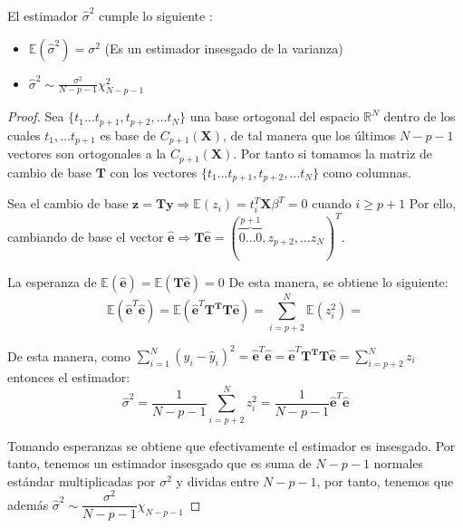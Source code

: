 \begin{propo}
El estimador $\hat{\sigma}^2$ cumple lo siguiente :
\begin{itemize}
\item $\mathbb{E}(\hat{\sigma} ^2)=\sigma^2$ (Es un estimador insesgado de la varianza)
\item  $\hat{\sigma}^2 \sim \frac{\sigma^2}{N-p-1}\chi_{N-p-1}^2 $
\end{itemize}
\begin{proof}
\noindent Sea $\lbrace t_{1}\ldots t_{p+1}, t_{p+2}, \ldots t_{N}\rbrace$ una base ortogonal del espacio $\mathbb{R}^N$ dentro de los cuales $t_{1},\ldots t_{p+1}$ es base de $C_{p+1}(\mathbf{X})$, de tal manera que los últimos $N-p-1$ vectores son ortogonales a la $C_{p+1}(\mathbf{X})$. Por tanto si tomamos la matriz de cambio de base $\mathbf{T}$ con los vectores $\lbrace t_{1}\ldots t_{p+1}, t_{p+2}, \ldots t_{N}\rbrace$ como columnas. 

\noindent Sea el cambio de base $\mathbf{z}=\mathbf{T} \mathbf{y}\Rightarrow \mathbb{E}(z_i)=t_i^T \mathbf{X}\beta^T=0 $ cuando $i\geq p+1$ Por ello, cambiando de base el vector $\hat{\mathbf{e}}\Rightarrow \mathbf{T}\hat{\mathbf{e}}=(\overbrace{0\ldots 0}^{p+1},z_{p+2},\ldots z_{N})^T$.

\noindent La esperanza de $\mathbb{E}(\hat{\mathbf{e}})=\mathbb{E}(\mathbf{T}\hat{\mathbf{e}})=0$ De esta manera, se obtiene lo siguiente:
\begin{equation}
\mathbb{E}(\hat{\mathbf{e}}^T\hat{\mathbf{e}})=\mathbb{E}(\hat{\mathbf{e}}^T \mathbf{T^T T}\hat{\mathbf{e}})=\sum_{i=p+2}^N\mathbb{E}(z_i^2)=
\end{equation}

\noindent De esta manera, como $\sum_{i=1}^N(y_i-\hat{y}_i)^2=\hat{\mathbf{e}}^T\hat{\mathbf{e}}= \hat{\mathbf{e}}^T \mathbf{T^T T} \hat{\mathbf{e}}=\sum_{i=p+2}^N z_i$ entonces el estimador:
\begin{equation}
\hat{\sigma}^2=\dfrac{1}{N-p-1}\sum_{i=p+2}^N z_i^2=\dfrac{1}{N-p-1}\hat{\mathbf{e}}^T\hat{\mathbf{e}}
\end{equation}

\noindent Tomando esperanzas se obtiene que efectivamente el estimador es insesgado. 
Por tanto, tenemos un estimador insesgado que es suma de $N-p-1$ normales estándar multiplicadas por $\sigma^2$ y dividas entre $N-p-1$, por tanto, tenemos que además $\hat{\sigma}^2\sim \dfrac{\sigma^2}{N-p-1}\chi_{N-p-1}$
\end{proof}
\end{propo}

